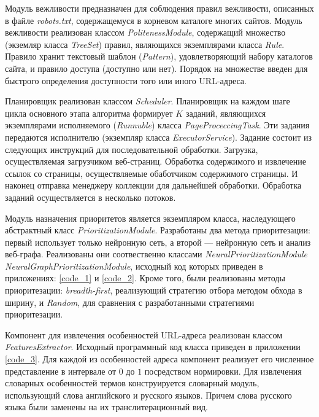 Модуль вежливости предназначен для соблюдения правил вежливости, описанных в файле \textit{robots.txt}, содержащемуся в корневом каталоге многих сайтов. Модуль вежливости реализован классом \textit{PolitenessModule}, содержащий множество (экземляр класса \textit{TreeSet}) правил, являющихся экземплярами класса \textit{Rule}. Правило хранит текстовый шаблон (\textit{Pattern}), удовлетворяющий набору каталогов сайта, и правило доступа (доступно или нет). Порядок на множестве введен для быстрого определения доступности того или иного URL-адреса.

Планировщик реализован классом \textit{Scheduler}. Планировщик на каждом шаге цикла основного этапа алгоритма формирует $K$ заданий, являющихся экземплярами исполняемого (\textit{Runnuble}) класса \textit{PageProceccingTask}. Эти задания передаются исполнителю (экземпляр класса \textit{ExecutorService}). Задание состоит из следующих инструкций для последовательной обработки. Загрузка, осуществляемая загрузчиком веб-страниц. Обработка содержимого и извлечение ссылок со страницы, осуществляемые обаботчиком содержимого страницы. И наконец отправка менеджеру коллекции для дальнейшей обработки. Обработка заданий осуществляется в несколько потоков.

Модуль назначения приоритетов является экземпляром класса, наследующего абстрактный класс \textit{PrioritizationModule}. Разработаны два метода приоритезации: первый использует только нейронную сеть, а второй --- нейронную сеть и анализ веб-графа. Реализованы они соотвественно классами \textit{NeuralPrioritizationModule} \textit{NeuralGraphPrioritizationModule}, исходный код которых приведен в приложениях: \ref{code_1} и \ref{code_2}. Кроме того, были реализованы методы приоритезации: \textit{breadth-first}, реализующий стратегию отбора методом обхода в ширину, и \textit{Random},  для сравнения с разработанными стратегиями приоритезации.

Компонент для извлечения особенностей URL-адреса реализован классом \textit{FeaturesExtractor}. Исходный программный код класса приведен в приложении \ref{code_3}. Для каждой из особенностей адреса компонент реализует его численное представление в интервале от $0$ до $1$ посредством нормировки. Для извлечения словарных особенностей термов конструируется словарный модуль, использующий слова английского и русского языков. Причем слова русского языка были заменены на их транслитерационный вид.

